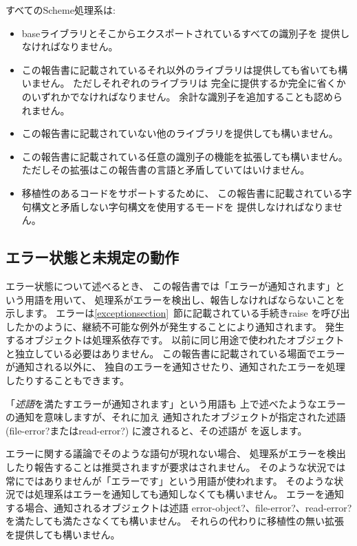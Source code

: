 すべてのScheme処理系は:
\begin{itemize}

\item baseライブラリとそこからエクスポートされているすべての識別子を
提供しなければなりません。

\item この報告書に記載されているそれ以外のライブラリは提供しても省いても構いません。
ただしそれぞれのライブラリは
完全に提供するか完全に省くかのいずれかでなければなりません。
余計な識別子を追加することも認められません。

\item この報告書に記載されていない他のライブラリを提供しても構いません。

\item この報告書に記載されている任意の識別子の機能を拡張しても構いません。
ただしその拡張はこの報告書の言語と矛盾していてはいけません。

\item 移植性のあるコードをサポートするために、
この報告書に記載されている字句構文と矛盾しない字句構文を使用するモードを
提供しなければなりません。
\end{itemize}

\subsection{エラー状態と未規定の動作}
\label{errorsituations}

エラー状態について述べるとき、
この報告書では「エラーが通知されます」という用語を用いて、
処理系がエラーを検出し、報告しなければならないことを示します。
エラーは\ref{exceptionsection}~節に記載されている手続き{\cf raise}
を呼び出したかのように、継続不可能な例外が発生することにより通知されます。
発生するオブジェクトは処理系依存です。
以前に同じ用途で使われたオブジェクトと独立している必要はありません。
この報告書に記載されている場面でエラーが通知される以外に、
独自のエラーを通知させたり、通知されたエラーを処理したりすることもできます。

「{\em 述語}を満たすエラーが通知されます」という用語も
上で述べたようなエラーの通知を意味しますが、それに加え
通知されたオブジェクトが指定された述語({\cf file-error?}または{\cf read-error?})
に渡されると、その述語が \schtrue{} を返します。

\vest エラーに関する議論でそのような語句が現れない場合、
処理系がエラーを検出したり報告することは推奨されますが要求はされません。
そのような状況では常にではありませんが「エラーです」という用語が使われます。
そのような状況では処理系はエラーを通知しても通知しなくても構いません。
エラーを通知する場合、通知されるオブジェクトは述語
{\cf error-object?}、{\cf file-error?}、{\cf read-error?}
を満たしても満たさなくても構いません。
それらの代わりに移植性の無い拡張を提供しても構いません。

